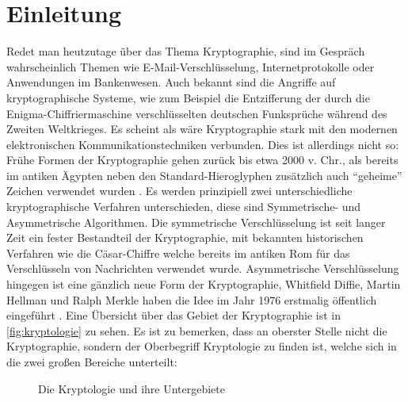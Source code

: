 \chapter{Einleitung}
Redet man heutzutage über das Thema Kryptographie, sind im Gespräch wahrscheinlich
Themen wie E-Mail-Verschlüsselung, Internetprotokolle oder Anwendungen im
Bankenwesen. Auch bekannt sind die Angriffe auf kryptographische Systeme,
wie zum Beispiel die Entzifferung der durch die Enigma-Chiffriermaschine
verschlüsselten deutschen Funksprüche während des Zweiten Weltkrieges. Es scheint als
wäre Kryptographie stark mit den modernen elektronischen Kommunikationstechniken
verbunden. Dies ist allerdings nicht so: Frühe Formen der Kryptographie
gehen zurück bis etwa 2000 v. Chr., als bereits im antiken Ägypten neben den
Standard-Hieroglyphen zusätzlich auch \enquote{geheime} Zeichen
verwendet wurden \parencite[2]{BOOK:crypto}. Es werden prinzipiell zwei
unterschiedliche kryptographische Verfahren unterschieden, diese sind
Symmetrische- und Asymmetrische Algorithmen. Die symmetrische Verschlüsselung ist
seit langer Zeit ein fester Bestandteil der Kryptographie, mit bekannten historischen
Verfahren wie die Cäsar-Chiffre welche bereits im antiken Rom für das Verschlüsseln von
Nachrichten verwendet wurde. Asymmetrische Verschlüsselung hingegen ist eine gänzlich neue Form
der Kryptographie, Whitfield Diffie, Martin Hellman und Ralph Merkle haben die Idee im Jahr
1976 erstmalig öffentlich eingeführt \parencite[3]{BOOK:crypto}.
Eine Übersicht über das Gebiet der Kryptographie ist in \autoref{fig:kryptologie} zu sehen.
Es ist zu bemerken, dass an oberster Stelle nicht die Kryptographie, sondern
der Oberbegriff Kryptologie zu finden ist, welche sich in die zwei großen Bereiche unterteilt:

\begin{figure}
  \centering

  \caption{Die Kryptologie und ihre Untergebiete \parencite[3]{BOOK:crypto}}
  \label{fig:kryptologie}
\end{figure}


